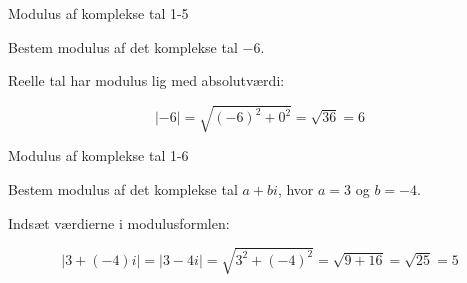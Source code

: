 \documentclass{article}
\begin{document}
\newpage

\begin{exercise}{Modulus af komplekse tal 1-5}

Bestem modulus af det komplekse tal $-6$.


\hint

Reelle tal har modulus lig med absolutværdi:

\hint
\[
|-6| = \sqrt{(-6)^2 + 0^2} = \sqrt{36} = 6
\]

\end{exercise}

\newpage

\begin{exercise}{Modulus af komplekse tal 1-6}

Bestem modulus af det komplekse tal $a + bi$, hvor $a = 3$ og $b = -4$.


\hint

Indsæt værdierne i modulusformlen:

\hint
\[
|3 + (-4)i| = |3 - 4i| = \sqrt{3^2 + (-4)^2} = \sqrt{9 + 16} = \sqrt{25} = 5
\]

\end{exercise}
\end{document}
